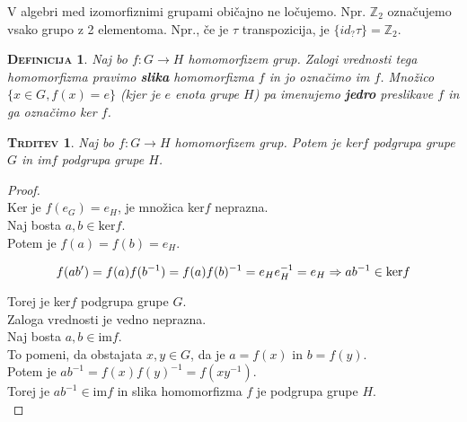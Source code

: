 \documentclass[a4paper,12pt]{article}
\newtheorem*{trditev}{\textsc{Trditev}}
\newtheorem*{definicija}{\textsc{Definicija}}
\begin{document}
\noindent V algebri med izomorfiznimi grupami običajno ne ločujemo. Npr. $\mathbb{Z}_2$  označujemo vsako grupo z 2 elementoma. Npr., če je $\tau$ transpozicija, je $\{id_?\tau\}=\mathbb{Z}_2$.\\

\begin{definicija}
Naj bo $f:G\to H$ homomorfizem grup. Zalogi vrednosti tega  homomorfizma pravimo \textbf{slika} homomorfizma $f$ in jo označimo \emph{im $f$}.  Množico $\{x\in G,f(x)=e\}$ (kjer je $e$ enota grupe $H$) pa imenujemo \textbf{jedro} preslikave $f$ in ga označimo \emph{ker $f$}.\\
\end{definicija}


\begin{trditev}
Naj bo $f:G\to H$ homomorfizem grup. Potem je \emph{ker$f$} podgrupa grupe $G$ in \emph{im$f$} podgrupa grupe $H$.\\
\end{trditev}

\begin{proof} ~\\

\noindent Ker je $f(e_G)=e_H$, je množica ker$f$ neprazna. \\

Naj bosta $a,b\in \text{ker}f$. \\

Potem je $f(a)=f(b)=e_H$.

\begin{equation*}
f(ab')=f(a)f(b^{-1})=f(a)f(b)^{-1}=e_H e_H^{-1} = e_H \Rightarrow ab^{-1}\in \text{ker}f \\
\end{equation*}

Torej je ker$f$ podgrupa grupe $G$. \\

Zaloga vrednosti je vedno neprazna. \\

\noindent Naj bosta $a,b\in \text{im}f$. \\

To pomeni, da obstajata $x,y\in G$, da je $a=f(x)$ in $b=f(y)$. \\

Potem je $ab^{-1}=f(x)f(y)^{-1}=f(xy^{-1})$. \\

Torej je $ab^{-1}\in \text{im}f$ in slika homomorfizma $f$ je podgrupa grupe $H$.\\
\end{proof}
\end{document}
